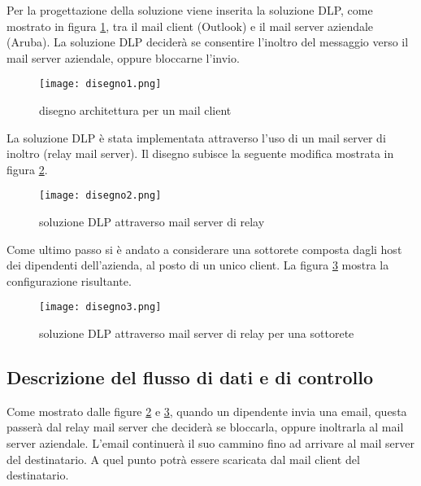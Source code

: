   Per la progettazione della soluzione viene inserita la soluzione DLP,
  come mostrato in figura \ref{disegno1},
  tra il mail client (Outlook) e il mail server aziendale (Aruba). La soluzione DLP deciderà se consentire l'inoltro
  del messaggio verso il mail server aziendale, oppure bloccarne l'invio.
  \begin{figure}[htp]
    \centering
    \texttt{[image: disegno1.png]}
    \caption{disegno architettura per un mail client}\label{disegno1}
  \end{figure}

  \pagebreak
  La soluzione DLP è stata implementata attraverso l'uso di un mail server di inoltro (relay mail server).
  Il disegno subisce la seguente modifica mostrata in figura \ref{disegno2}.

  \begin{figure}[htp]
    \centering
    \texttt{[image: disegno2.png]}
    \caption{soluzione DLP attraverso mail server di relay}\label{disegno2}
  \end{figure}

  Come ultimo passo si è andato a considerare una sottorete composta dagli host dei dipendenti dell'azienda, al
  posto di un unico client. La figura \ref{disegno3} mostra la configurazione risultante.

  \begin{figure}[htp]
    \centering
    \texttt{[image: disegno3.png]}
    \caption{soluzione DLP attraverso mail server di relay per una sottorete}\label{disegno3}
  \end{figure}

  \subsection{Descrizione del flusso di dati e di controllo}
  Come mostrato dalle figure \ref{disegno2} e \ref{disegno3}, quando un dipendente invia una email, questa
  passerà dal relay mail server che deciderà se bloccarla, oppure inoltrarla al mail server aziendale. L'email
  continuerà il suo cammino fino ad arrivare al mail server del destinatario. A quel punto potrà essere scaricata
  dal mail client del destinatario.